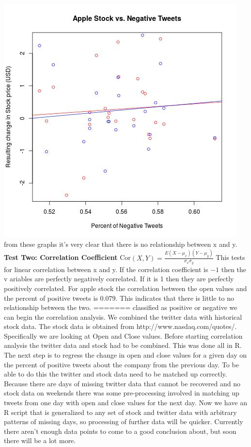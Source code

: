 \documentclass{acm_proc_article-sp}
\begin{document}
\begin{doublespace}
\newline\includegraphics[scale=.5]{apple_negative.jpeg} 
\newline\indent from these graphs it's very clear that there is no relationship between x and y. 
\newline\newline\textbf{Test Two: Correlation Coefficient}
\newline\indent Cor$(X,Y) = \frac{E ( X - \mu_x)(Y - \mu_y)}{\sigma_x\sigma_y}$
\newline\indent This tests for linear correlation between x and y. If the correlation coefficient is $-1$ then the v
ariables are perfectly negatively correlated. If it is 1 then they are perfectly positively correlated.
\newline\indent For apple stock the correlation between the open values and the percent of positive tweets is $0.079
$. This indicates that there is little to no relationship between the two. 
=======
classified as positive or negative we can begin the correlation analysis. We
combined the twitter data with historical stock data. The stock data is
obtained from http://www.nasdaq.com/quotes/. Specifically we are looking at
Open and Close values. Before starting correlation analysis the twitter data
and stock had to be combined. This was done all in R. The next step is to
regress the change in open and close values for a given day on the percent of
positive tweets about the company from the previous day. To be able to do this
the twitter and stock data need to be matched up correctly. Because there are
days of missing twitter data that cannot be recovered and no stock data on
weekends there was some pre-processing involved in matching up tweets from one
day with open and close values for the next day. Now we have an R script that
is generalized to any set of stock and twitter data with arbitrary patterns of
missing days, so processing of further data will be quicker. Currently there
aren't enough data points to come to a good conclusion about, but soon there
will be a lot more.


\end{doublespace}
\end{document}
